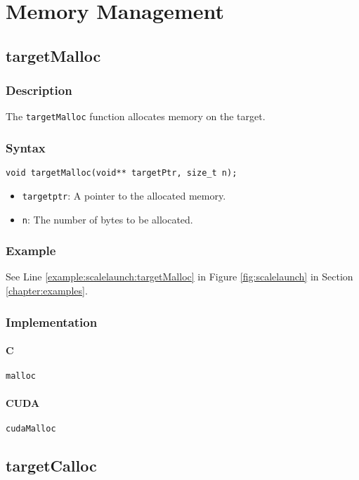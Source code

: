 \chapter{Memory Management}\label{chap:memmanage}



\newpage
\section{targetMalloc}

\subsection{Description}

The \verb+targetMalloc+ function allocates memory on the target.

\subsection{Syntax}
\begin{verbatim}
void targetMalloc(void** targetPtr, size_t n);
\end{verbatim}

\begin{itemize}
\item \verb+targetptr+: A pointer to the allocated memory.
\item \verb+n+: The number of bytes to be allocated.
\end{itemize}


\subsection{Example}
See Line \ref{example:scalelaunch:targetMalloc} in Figure \ref{fig:scalelaunch} in Section \ref{chapter:examples}.
\subsection{Implementation}
\subsubsection{C}
\verb+malloc+
\subsubsection{CUDA}
\verb+cudaMalloc+

\newpage
\section{targetCalloc}

